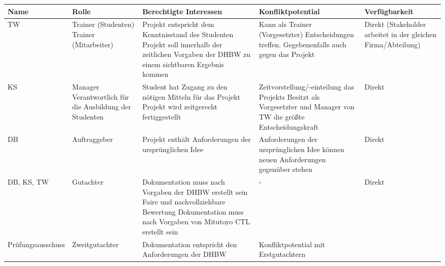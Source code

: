 \begin{table}[H]
    {
        \tiny
        \begin{tabularx}{\linewidth}{|X|X|X|X|X|}
            \hline
            Name & Rolle                                                                                         & Berechtigte Interessen & Konfliktpotential & Verfügbarkeit \\
            \hline
            \cline{1-5}
            TW
                 & Trainer (Studenten) \newline
            Trainer (Mitarbeiter)
                 & Projekt entspricht dem Kenntnisstand des Studenten \newline
            Projekt soll innerhalb der zeitlichen Vorgaben der DHBW zu einem sichtbaren Ergebnis kommen
                 & Kann als Trainer (Vorgesetzter) Entscheidungen treffen. Gegebenenfalls auch gegen das Projekt
                 & Direkt (Stakeholder arbeitet in der gleichen Firma/Abteilung)
            \\
            \cline{1-5}
            KS
                 & Manager \newline
            Verantwortlich für die Ausbildung der Studenten
                 & Student hat Zugang zu den nötigen Mitteln für das Projekt
            Projekt wird zeitgerecht fertiggestellt
                 & Zeitvorstellung/-einteilung das Projekts \newline
            Besitzt als Vorgesetzter und Manager von TW die größte Entscheidungskraft
                 & Direkt
            \\
            \cline{1-5}
            DB
                 & Auftraggeber
                 & Projekt enthält Anforderungen der ursprünglichen Idee
                 & Anforderungen der ursprünglichen Idee können neuen Anforderungen gegenüber stehen
                 & Direkt
            \\
            \cline{1-5}
            DB, KS, TW
                 & Gutachter
                 & Dokumentation muss nach Vorgaben der DHBW erstellt sein \newline
            Faire und nachvollziehbare Bewertung \newline
            Dokumentation muss nach Vorgaben von Mitutoyo CTL erstellt sein
                 & -
                 & Direkt
            \\
            \cline{1-5}
            Prüfungsausschuss
                 & Zweitgutachter
                 & Dokumentation entspricht den Anforderungen der DHBW
                 & Konfliktpotential mit Erstgutachtern

\end{tabularx}}
\end{table}
